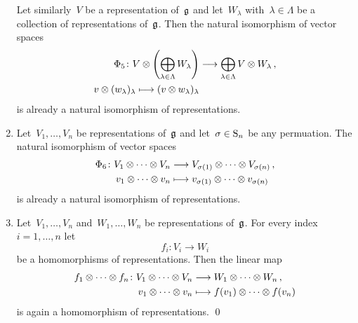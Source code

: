 \begin{proposition}
\begin{enumerate}
      Let similarly~$V$ be a representation of~$\mathfrak{g}$ and let~$W_\lambda$ with~$\lambda \in \Lambda$ be a collection of representations of~$\mathfrak{g}$.
      Then the natural isomorphism of vector spaces
      \begin{align*}
        \Phi_5
        \colon
        V
        \tensor
        \Biggl(
          \bigoplus_{\lambda \in \Lambda}
          W_\lambda
        \Biggr)
        &\to
        \bigoplus_{\lambda \in \Lambda}
        V \tensor W_\lambda \,,
        \\
        v \tensor (w_\lambda)_\lambda
        \mapsto
        (v \tensor w_\lambda)_\lambda
      \end{align*}
      is already a natural isomorphism of representations.
    \item
      Let~$V_1, \dotsc, V_n$ be representations of~$\mathfrak{g}$ and let~$\sigma \in \operatorname{S}_n$ be any permuation.
      The natural isomorphism of vector spaces
      \begin{align*}
        \Phi_6
        \colon 
        V_1 \tensor \dotsb \tensor V_n
        &\to
        V_{\sigma(1)} \tensor \dotsb \tensor V_{\sigma(n)} \,,
        \\
        v_1 \tensor \dotsb \tensor v_n
        &\mapsto
        v_{\sigma(1)} \tensor \dotsb \tensor v_{\sigma(n)}
      \end{align*}
      is already a natural isomorphism of representations.
    \item
      Let~$V_1, \dotsc, V_n$ and~$W_1, \dotsc, W_n$ be representations of~$\mathfrak{g}$.
      For every index~$i = 1, \dotsc, n$ let
      \[
        f_i \colon V_i \to W_i
      \]
      be a homomorphisms of representations.
      Then the linear map
      \begin{align*}
        f_1 \tensor \dotsb \tensor f_n
        \colon
        V_1 \tensor \dotsb \tensor V_n
        &\to
        W_1 \tensor \dotsb \tensor W_n \,,
        \\
        v_1 \tensor \dotsb \tensor v_n
        &\mapsto
        f(v_1) \tensor \dotsb \tensor f(v_n)
      \end{align*}
      is again a homomorphism of representations.
    \qed
  \end{enumerate}
\end{proposition}


